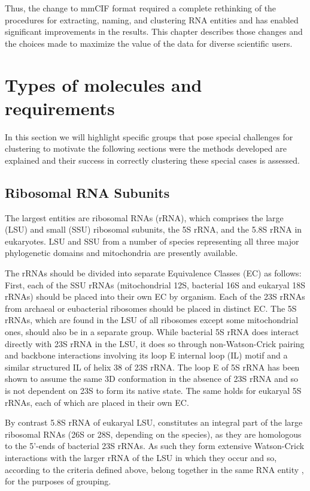 Thus, the change to mmCIF format required a complete rethinking of the
procedures for extracting, naming, and clustering RNA entities and has enabled
significant improvements in the results. This chapter describes those changes
and the choices made to maximize the value of the data for diverse scientific
users. 

\section{Types of molecules and requirements}

In this section we will highlight specific groups that pose special challenges
for clustering to motivate the following sections were the methods developed are
explained and their success in correctly clustering these special cases is
assessed. 

\subsection{Ribosomal RNA Subunits}

The largest entities are ribosomal RNAs (rRNA), which comprises the large (LSU)
and small (SSU) ribosomal subunits, the 5S rRNA, and the 5.8S rRNA in
eukaryotes. LSU and SSU from a number of species representing all three major
phylogenetic domains and mitochondria are presently available.

The rRNAs should be divided into separate Equivalence Classes (EC) as follows:
First, each of the SSU rRNAs (mitochondrial 12S, bacterial 16S and eukaryal 18S
rRNAs) should be placed into their own EC by organism. Each of the 23S rRNAs
from archaeal or eubacterial ribosomes should be placed in distinct EC. The 5S
rRNAs, which are found in the LSU of all ribosomes except some mitochondrial
ones, should also be in a separate group. While bacterial 5S rRNA does interact
directly with 23S rRNA in the LSU, it does so through non-Watson-Crick pairing
and backbone interactions involving its loop E internal loop (IL) motif and a
similar structured IL of helix 38 of 23S rRNA. The loop E of 5S rRNA has been
shown to assume the same 3D conformation in the absence of 23S rRNA and so is
not dependent on 23S to form its native state. The same holds for eukaryal 5S
rRNAs, each of which are placed in their own EC.

By contrast 5.8S rRNA of eukaryal LSU, constitutes an integral part of the large
ribosomal RNAs (26S or 28S, depending on the species), as they are homologous to
the 5’-ends of bacterial 23S rRNAs. As such they form extensive Watson-Crick
interactions with the larger rRNA of the LSU in which they occur and so,
according to the criteria defined above, belong together in the same RNA entity
, for the purposes of grouping. 

